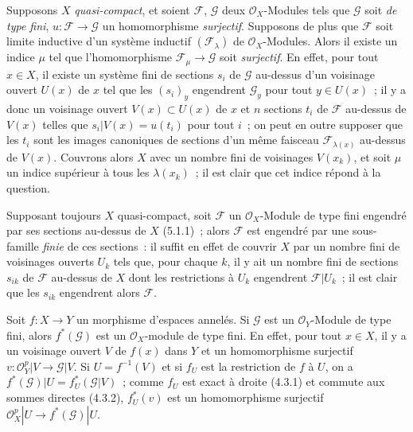 \begin{env}[5.2.3]
\label{0.5.2.3-fr}
Supposons $X$ \emph{quasi-compact}, et soient $\mathcal{F}$, $\mathcal{G}$ deux
$\mathcal{O}_X$-Modules tels que $\mathcal{G}$ soit \emph{de type fini},
$u:\mathcal{F}\to\mathcal{G}$ un homomorphisme \emph{surjectif}. Supposons de
plus que $\mathcal{F}$ soit limite inductive d'un système inductif
$(\mathcal{F}_\lambda)$ de $\mathcal{O}_X$-Modules. Alors il existe un indice
$\mu$ tel que l'homomorphisme $\mathcal{F}_\mu\to\mathcal{G}$ soit
\emph{surjectif}. En effet, pour tout $x\in X$, il existe un système fini de
sections $s_i$ de $\mathcal{G}$ au-dessus d'un voisinage ouvert $U(x)$ de $x$
tel que les $(s_i)_y$ engendrent $\mathcal{G}_y$ pour tout $y\in U(x)$~; il y
a donc un voisinage ouvert $V(x)\subset U(x)$ de $x$ et $n$ sections $t_i$ de
$\mathcal{F}$ au-dessus de $V(x)$ telles que
$s_i|V(x)=u(t_i)$ pour tout $i$~; on peut en outre supposer que les $t_i$ sont
les images canoniques de sections d'un même faisceau
$\mathcal{F}_{\lambda(x)}$ au-dessus de $V(x)$. Couvrons alors $X$ avec un
nombre fini de voisinages $V(x_k)$, et soit $\mu$ un indice supérieur à tous
les $\lambda(x_k)$~; il est clair que cet indice répond à la question.

Supposant toujours $X$ quasi-compact, soit $\mathcal{F}$ un
$\mathcal{O}_X$-Module de type fini engendré par ses sections au-dessus de $X$
(5.1.1)~; alors $\mathcal{F}$ est engendré par une sous-famille \emph{finie}
de ces sections~: il suffit en effet de couvrir $X$ par un nombre fini de
voisinages ouverts $U_k$ tels que, pour chaque $k$, il y ait un nombre fini de
sections $s_{ik}$ de $\mathcal{F}$ au-dessus de $X$ dont les restrictions à
$U_k$ engendrent $\mathcal{F}|U_k$~; il est clair que les $s_{ik}$ engendrent
alors $\mathcal{F}$.
\end{env}

\begin{env}[5.2.4]
\label{0.5.2.4-fr}
Soit $f:X\to Y$ un morphisme d'espaces annelés. Si $\mathcal{G}$ est un
$\mathcal{O}_Y$-Module de type fini, alors $f^*(\mathcal{G})$ est un
$\mathcal{O}_X$-module de type fini. En effet, pour tout $x\in X$, il y a un
voisinage ouvert $V$ de $f(x)$ dans $Y$ et un homomorphisme surjectif
$v:\mathcal{O}_Y^p|V\to\mathcal{G}|V$. Si $U=f^{-1}(V)$ et si $f_U$ est la
restriction de $f$ à $U$, on a
$f^*(\mathcal{G})|U=f_U^*(\mathcal{G}|V)$~; comme $f_U$ est exact à droite
(4.3.1) et commute aux sommes directes (4.3.2), $f_U^*(v)$ est un
homomorphisme surjectif
$\mathcal{O}_X^p|U\to f^*(\mathcal{G})|U$.
\end{env}

